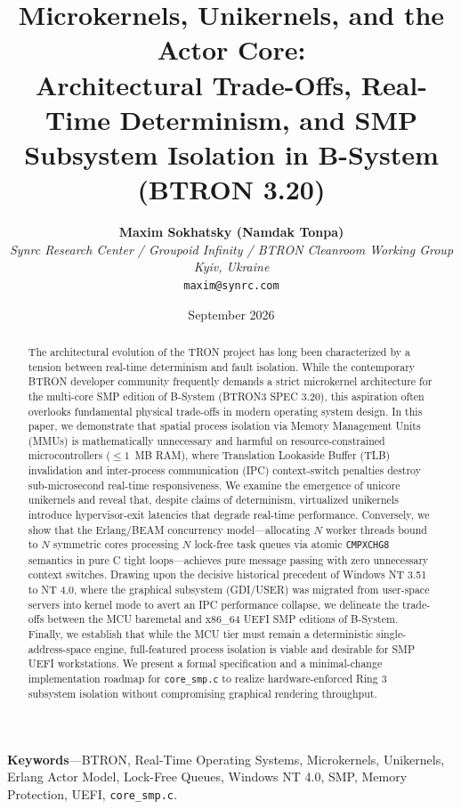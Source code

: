 \documentclass[10pt,journal,compsoc,twocolumn]{article}
\title{\LARGE \textbf{Microkernels, Unikernels, and the Actor Core:\\Architectural Trade-Offs, Real-Time Determinism, and SMP Subsystem Isolation in B-System (BTRON 3.20)}}
\author{
    \textbf{Maxim Sokhatsky (Namdak Tonpa)}\\[0.3em]
    \small \textit{Synrc Research Center / Groupoid Infinity / BTRON Cleanroom Working Group}\\
    \small \textit{Kyiv, Ukraine}\\
    \small \texttt{maxim@synrc.com}
}
\date{September 2026}
\begin{document}
\maketitle

\begin{abstract}
The architectural evolution of the TRON project has long been characterized by a tension between real-time determinism and fault isolation. While the contemporary BTRON developer community frequently demands a strict microkernel architecture for the multi-core SMP edition of B-System (BTRON3 SPEC 3.20), this aspiration often overlooks fundamental physical trade-offs in modern operating system design. In this paper, we demonstrate that spatial process isolation via Memory Management Units (MMUs) is mathematically unnecessary and harmful on resource-constrained microcontrollers ($\le 1$~MB RAM), where Translation Lookaside Buffer (TLB) invalidation and inter-process communication (IPC) context-switch penalties destroy sub-microsecond real-time responsiveness. We examine the emergence of unicore unikernels and reveal that, despite claims of determinism, virtualized unikernels introduce hypervisor-exit latencies that degrade real-time performance. Conversely, we show that the Erlang/BEAM concurrency model---allocating $N$ worker threads bound to $N$ symmetric cores processing $N$ lock-free task queues via atomic \texttt{CMPXCHG8} semantics in pure C tight loops---achieves pure message passing with zero unnecessary context switches. Drawing upon the decisive historical precedent of Windows NT 3.51 to NT 4.0, where the graphical subsystem (GDI/USER) was migrated from user-space servers into kernel mode to avert an IPC performance collapse, we delineate the trade-offs between the MCU baremetal and x86\_64 UEFI SMP editions of B-System. Finally, we establish that while the MCU tier must remain a deterministic single-address-space engine, full-featured process isolation is viable and desirable for SMP UEFI workstations. We present a formal specification and a minimal-change implementation roadmap for \texttt{core\_smp.c} to realize hardware-enforced Ring 3 subsystem isolation without compromising graphical rendering throughput.
\end{abstract}

\noindent\textbf{\small Keywords}---BTRON, Real-Time Operating Systems, Microkernels, Unikernels, Erlang Actor Model, Lock-Free Queues, Windows NT 4.0, SMP, Memory Protection, UEFI, \texttt{core\_smp.c}.

\end{document}
